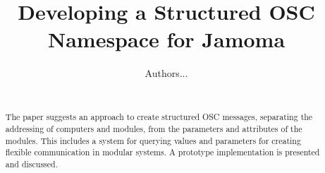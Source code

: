 \documentclass{sig-alternate}
\begin{document}
	
%

\title{Developing a Structured OSC Namespace for Jamoma}
\subtitle{}
%
%

%

\author{
%
\alignauthor Authors... \\
       \\
}

\maketitle






\begin{abstract}

The paper suggests an approach to create structured OSC messages, separating the addressing of computers and modules, from the parameters and attributes of the modules. This includes a system for querying values and parameters for creating flexible communication in modular systems. A prototype implementation is presented and discussed.

\end{abstract}
\end{document}
